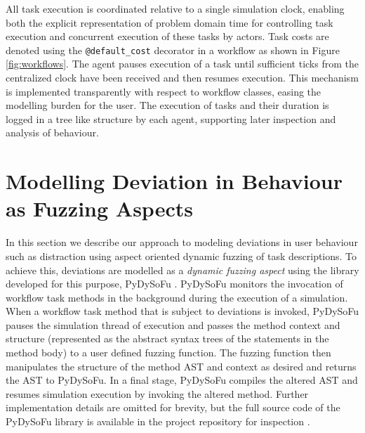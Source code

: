 \documentclass{llncs}
\begin{document}
All task execution is coordinated relative to a single simulation clock, enabling both the explicit representation of
problem domain time for controlling task execution and concurrent execution of these tasks by actors.  Task costs are
denoted using the \lstinline!@default_cost! decorator in a workflow as shown in Figure \ref{fig:workflows}.  The agent
pauses execution of a task until sufficient ticks from the centralized clock have been received and then resumes execution.
This mechanism is implemented transparently with respect to workflow classes, easing the modelling burden for the user.
The execution of tasks and their duration is logged in a tree like structure by each agent, supporting later inspection
and analysis of behaviour.


\section{Modelling Deviation in Behaviour as Fuzzing Aspects}
\label{sec:fuzzing}


In this section we describe our approach to modeling deviations in user behaviour such as distraction using aspect
oriented dynamic fuzzing of task descriptions.  To achieve this, deviations are modelled as a \emph{dynamic fuzzing
  aspect} using the library developed for this purpose, PyDySoFu \cite{storer2016pydysofu-scm}.  PyDySoFu monitors the
invocation of workflow task methods in the background during the execution of a simulation.  When a workflow task method
that is subject to deviations is invoked, PyDySoFu pauses the simulation thread of execution and passes the method
context and structure (represented as the abstract syntax trees of the statements in the method body) to a user defined
fuzzing function.  The fuzzing function then manipulates the structure of the method AST and context as desired and
returns the AST to PyDySoFu.  In a final stage, PyDySoFu compiles the altered AST and resumes simulation execution by
invoking the altered method.  Further implementation details are omitted for brevity, but the full source code of the
PyDySoFu library is available in the project repository for inspection \cite{storer2016pydysofu-scm}.
\end{document}
